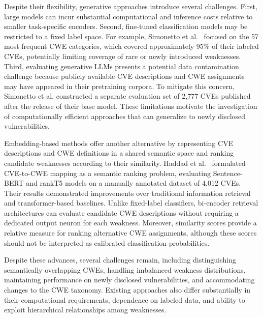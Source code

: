\documentclass[conference,compsoc]{IEEEtran}
\begin{document}
Despite their flexibility, generative approaches
introduce several challenges. First, large models
can incur substantial computational and inference
costs relative to smaller task-specific encoders.
Second, fine-tuned classification models may be
restricted to a fixed label space. For example,
Simonetto et al.~\cite{simonetto2026knowing}
focused on the 57 most frequent CWE categories,
which covered approximately 95\% of their labeled
CVEs, potentially limiting coverage of rare or
newly introduced weaknesses. Third, evaluating
generative LLMs presents a potential data
contamination challenge because publicly available
CVE descriptions and CWE assignments may have
appeared in their pretraining corpora. To mitigate
this concern, Simonetto et al. constructed a
separate evaluation set of 2,777 CVEs published
after the release of their base model. These
limitations motivate the investigation of
computationally efficient approaches that can
generalize to newly disclosed vulnerabilities.

Embedding-based methods offer another alternative
by representing CVE descriptions and CWE definitions
in a shared semantic space and ranking candidate
weaknesses according to their similarity.
Haddad et al.~\cite{haddad2023automated}
formulated CVE-to-CWE mapping as a semantic ranking
problem, evaluating Sentence-BERT and rankT5
models on a manually annotated dataset of 4,012
CVEs. Their results demonstrated improvements
over traditional information retrieval and
transformer-based baselines. Unlike fixed-label
classifiers, bi-encoder retrieval architectures
can evaluate candidate CWE descriptions without
requiring a dedicated output neuron for each
weakness. Moreover, similarity scores provide
a relative measure for ranking alternative CWE
assignments, although these scores should not
be interpreted as calibrated classification
probabilities.

Despite these advances, several challenges remain,
including distinguishing semantically overlapping
CWEs, handling imbalanced weakness distributions,
maintaining performance on newly disclosed
vulnerabilities, and accommodating changes to the
CWE taxonomy. Existing approaches also differ
substantially in their computational requirements,
dependence on labeled data, and ability to exploit
hierarchical relationships among weaknesses.

\end{document}
